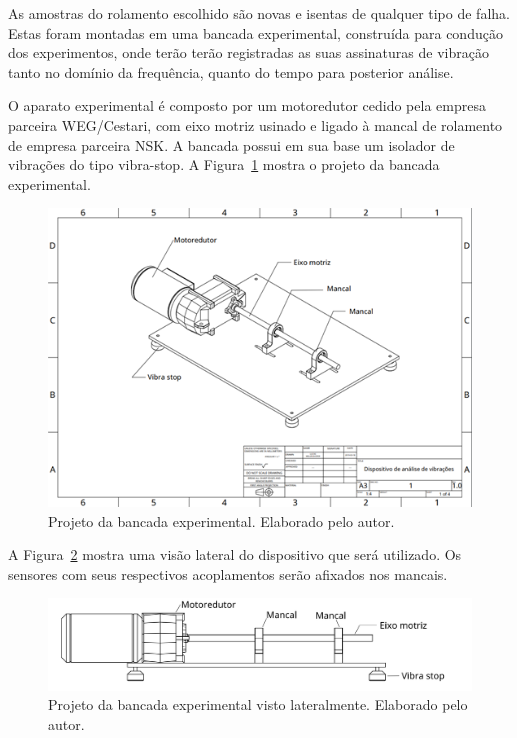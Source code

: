 \documentclass[
	12pt,				
	oneside,			
	a4paper,			
	english,			
	brazil,			
	]{abntex2ppgsi}
\begin{document}
As amostras do rolamento escolhido são novas e isentas de qualquer tipo de falha. Estas foram montadas em uma bancada experimental, construída para condução dos experimentos, onde terão terão registradas as suas assinaturas de vibração tanto no domínio da frequência, quanto do tempo para posterior análise. 

O aparato experimental é composto por um motoredutor cedido pela empresa parceira WEG/Cestari, com eixo motriz usinado e ligado à mancal de rolamento de empresa parceira NSK. A bancada possui em sua base um isolador de vibrações do tipo vibra-stop. A Figura~\ref{Figura22} mostra o projeto da bancada experimental. 

\begin{figure}[H]
\centering
\includegraphics[width=\textwidth,height=\textheight,keepaspectratio]{Figura22}
\caption {Projeto da bancada experimental. Elaborado pelo autor.}
\label{Figura22}
\end{figure}

A Figura~\ref{dispositivo_teste_visto_de_lado} mostra uma visão lateral do dispositivo que será utilizado. Os sensores com seus respectivos acoplamentos serão afixados nos mancais. 

\begin{figure}[H]
\centering
\includegraphics[width=\textwidth,height=\textheight,keepaspectratio]{dispositivo_teste_visto_de_lado}
\caption {Projeto da bancada experimental visto lateralmente. Elaborado pelo autor.}
\label{dispositivo_teste_visto_de_lado}
\end{figure}
\end{document}
